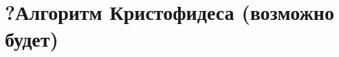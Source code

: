 \documentclass[12pt, fleqn]{article}
\begin{document}
  

  

  

  

  

  

  

  

  

  

  

  

  \section{?Алгоритм Кристофидеса (возможно будет)}
\end{document}
